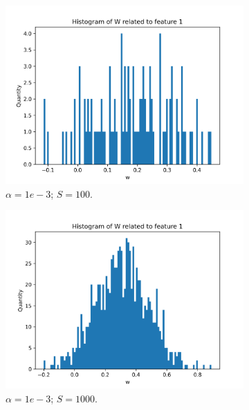 \documentclass{article}
\begin{document}
\begin{figure}
\begin{subfigure}[t]{0.24\textwidth}
    \includegraphics[width=\linewidth]{hist_feat0_10000_sample_100.png}
    \caption{$\alpha = 1e-3$; $S = 100$.}
  \end{subfigure}
  \hfill
  \begin{subfigure}[t]{0.24\textwidth}
    \centering
    \includegraphics[width=\linewidth]{hist_feat0_10000_sample_1000.png}
    \caption{$\alpha = 1e-3$; $S = 1000$.}
  \end{subfigure}
  \hfill
  \begin{subfigure}[t]{0.24\textwidth}
    \centering

\end{subfigure}
\end{figure}
\end{document}
